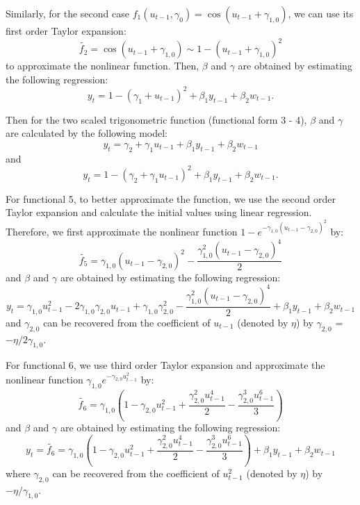 \documentclass[a4paper,12pt,times,numbered,print,index]{report}
\numberwithin{equation}{section}
\begin{document}
Similarly, for the second case $f_{1}\left( u_{t-1},\gamma _{0}\right) =\cos \left( u_{t-1}+\gamma_{1,0}\right)$, we can use its first order Taylor expansion: 
$$
\tilde{f_2} = \cos \left( u_{t-1}+\gamma_{1,0}\right) \sim 1 - \left( u_{t-1}+\gamma_{1,0}\right)^2
$$ 
to approximate the nonlinear function. Then, $\beta$ and $\gamma$ are obtained by estimating the following regression:
$$
y_t = 1 - \left( \gamma_{1} + u_{t-1}\right)^2  + \beta_{1}y_{t-1} + \beta_2w_{t-1}.
$$

Then for the two scaled trigonometric function (functional form 3 - 4), $\beta$ and $\gamma$ are calculated by the following model:
$$
y_t = \gamma_{2}  + \gamma_{1}u_{t-1} + \beta_{1}y_{t-1} + \beta_2w_{t-1}
$$
and 
$$
y_t = 1 - \left( \gamma_{2} + \gamma_{1}u_{t-1}\right)^2  + \beta_{1}y_{t-1} + \beta_2w_{t-1}.
$$



For functional 5, to better approximate the function, we use the second order Taylor expansion and calculate the initial values using linear regression. Therefore, we first approximate the nonlinear function $1 - e^{-\gamma_{1,0}\left(u_{t-1}-\gamma_{2,0}\right)^{2}}$ by:
$$
\tilde{f_5} = \gamma_{1,0}(u_{t-1} - \gamma_{2,0})^2 - \dfrac{\gamma_{1,0}^2(u_{t-1} - \gamma_{2,0})^4}{2}
$$
and $\beta$ and $\gamma$ are obtained by estimating the following regression:
$$
y_t = \gamma_{1,0}u_{t-1}^2 - 2\gamma_{1,0}\gamma_{2,0}u_{t-1} + \gamma_{1,0}\gamma_{2,0}^2 - \dfrac{\gamma_{1,0}^2(u_{t-1} - \gamma_{2,0})^4}{2} + \beta_{1}y_{t-1} + \beta_2w_{t-1}
$$
and $\gamma_{2,0}$ can be recovered from the coefficient of $u_{t-1}$ (denoted by $\eta$) by $\gamma_{2,0}$ = $-\eta/2\gamma_{1,0}$.

For functional 6, we use third order Taylor expansion and approximate the nonlinear function $\gamma_{1,0}e^{-\gamma_{2,0}u_{t-1}^2}$ by:
$$
\tilde{f_6}= \gamma_{1,0}(1-\gamma_{2,0}u_{t-1}^2 + \dfrac{\gamma_{2,0}^2 u_{t-1}^4}{2} - \dfrac{\gamma_{2,0}^3 u_{t-1}^6}{3})
$$
and $\beta$ and $\gamma$ are obtained by estimating the following regression:
$$
y_t = \tilde{f_6}= \gamma_{1,0}(1-\gamma_{2,0}u_{t-1}^2 + \dfrac{\gamma_{2,0}^2 u_{t-1}^4}{2} - \dfrac{\gamma_{2,0}^3 u_{t-1}^6}{3}) + \beta_{1}y_{t-1} + \beta_2w_{t-1}
$$
where $\gamma_{2,0}$ can be recovered from the coefficient of $u_{t-1}^2$ (denoted by $\eta$) by $-\eta/\gamma_{1,0}$.
\end{document}
